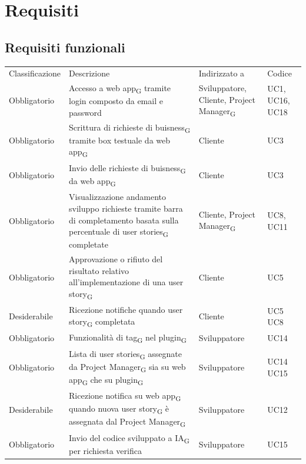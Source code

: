 \documentclass{article}
\begin{document}
\newpage
\section{Requisiti}
\subsection{Requisiti funzionali}
\begin{center}
    \begin{tabular}{|p{3cm}|p{6cm}|p{}|p{3cm}|}
    \rowcolor{Blue} 
\hline
Classificazione & Descrizione & Indirizzato a&Codice  \\ 
\rowcolor{LightBlue}
\hline
Obbligatorio & Accesso a web app\textsubscript{G} tramite login composto da email e password & Sviluppatore, Cliente, Project Manager\textsubscript{G} & UC1, UC16, UC18 \\ 
\rowcolor{LighterBlue}
\hline
Obbligatorio & Scrittura di richieste di buisness\textsubscript{G} tramite box testuale da web app\textsubscript{G} & Cliente & UC3\\ 
\rowcolor{LightBlue}
\hline
Obbligatorio & Invio delle richieste di buisness\textsubscript{G} da web app\textsubscript{G} & Cliente & UC3\\
\hline
\rowcolor{LighterBlue}

Obbligatorio & Visualizzazione andamento sviluppo richieste tramite barra di completamento basata sulla percentuale di user stories\textsubscript{G} completate & Cliente, Project Manager\textsubscript{G} & UC8, UC11\\
\rowcolor{LightBlue}
\hline
Obbligatorio & Approvazione o rifiuto del risultato relativo all'implementazione di una user story\textsubscript{G} & Cliente & UC5\\
\hline
\rowcolor{LighterBlue}

Desiderabile & Ricezione notifiche quando user story\textsubscript{G} completata & Cliente & UC5 UC8\\
\hline
\rowcolor{LightBlue}
\hline
Obbligatorio & Funzionalità di tag\textsubscript{G} nel plugin\textsubscript{G}  & Sviluppatore & UC14\\
\hline
\rowcolor{LighterBlue}

Obbligatorio & Lista di user stories\textsubscript{G} assegnate da Project Manager\textsubscript{G} sia su web app\textsubscript{G} che su plugin\textsubscript{G} & Sviluppatore & UC14 UC15\\
\hline
\rowcolor{LightBlue}

Desiderabile & Ricezione notifica su web app\textsubscript{G} quando nuova user story\textsubscript{G} è assegnata dal Project Manager\textsubscript{G}& Sviluppatore & UC12\\
\hline
\rowcolor{LighterBlue}
Obbligatorio & Invio del codice sviluppato a IA\textsubscript{G} per richiesta verifica& Sviluppatore & UC15\\


\end{tabular}
\end{center}
\end{document}

